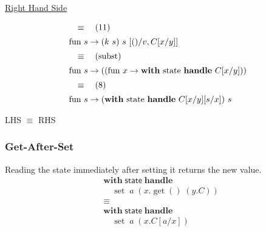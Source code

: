\documentclass[logo,bsc,singlespacing,parskip]{infthesis}
\begin{document}
\underline{Right Hand Side}

\[ 
\begin{array}{l}
\quad\equiv\quad (11) \\[5pt]
\text{fun } s \rightarrow (k\ s)\ s\ [()/v, C[x/y]] \\[5pt]
\quad\equiv\quad (\text{subst}) \\[5pt]
\text{fun } s \rightarrow ((\text{fun } x \rightarrow \text{\textbf{with} state \textbf{handle} } C[x/y])) \\[5pt]
\quad\equiv\quad (8) \\[5pt]
\text{fun } s \rightarrow (\text{\textbf{with} state \textbf{handle} } C[x/y][s/x])\ s
\end{array}
\]

LHS $\equiv$ RHS



\subsubsection*{Get-After-Set}
Reading the state immediately after setting it returns the new value.
\[
\begin{aligned}
    &\mathsf{\textbf{with}} \; \mathsf{state} \; \mathsf{\textbf{handle}} \\
    &\quad \operatorname{set} \; a \; (x. \operatorname{get}() \; (y. C)) \\
    &\equiv \\
    &\mathsf{\textbf{with}} \; \mathsf{state} \; \mathsf{\textbf{handle}} \\
    &\quad \operatorname{set} \; a \; (x. C[a/x])
\end{aligned}
\]
\end{document}
